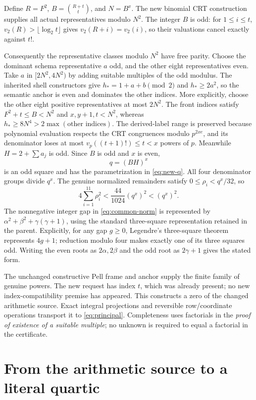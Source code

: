 \documentclass[11pt]{article}
\theoremstyle{definition}
\begin{document}
Define $R=F^2$, $B=\binom{R+t}{t}$, and $N=B^x$. The new binomial
CRT construction supplies all actual representatives modulo $N^2$.
The integer $B$ is odd: for $1\le i\le t$,
$v_2(R)>\lfloor\log_2t\rfloor$ gives $v_2(R+i)=v_2(i)$, so their
valuations cancel exactly against $t!$.

Consequently the representative classes modulo $N^2$ have free parity.
Choose the dominant schema representative $a$ odd, and the other eight
representatives even. Take $a$ in $[2N^2,4N^2)$ by adding suitable
multiples of the odd modulus. The inherited shell constructors give
$h_*=1+a+b\pmod2$ and $h_*\ge2a^2$, so the semantic anchor is even
and dominates the other indices. More explicitly, choose the other eight
positive representatives at most $2N^2$. The front indices satisfy
$F^2+t\le B<N^2$ and $x,y+1,t<N^2$, whereas
$h_*\ge8N^4>2\max(\text{other indices})$.
The derived-label range is preserved because polynomial evaluation
respects the CRT congruences modulo $p^{2xe}$, and its denominator loses
at most $v_p((t+1)!)\le t<x$ powers of $p$.
Meanwhile $H=2+\sum a_j$ is odd.
Since $B$ is odd and $x$ is even,
\[
                  q=(BH)^x
\]
is an odd square and has the parametrization in \eqref{eq:new-q}.
All four denominator groups divide $q^x$. The genuine normalized
remainders satisfy $0\le\rho_i<q^x/32$, so
\[
 4\sum_{i=1}^{11}\rho_i^2<\frac{44}{1024}(q^x)^2<(q^x)^2.
\]
The nonnegative integer gap in \eqref{eq:common-norm} is represented by
$\alpha^2+\beta^2+\gamma(\gamma+1)$, using the standard three-square
representation retained in the parent. Explicitly, for any gap $g\ge0$,
Legendre's three-square theorem represents $4g+1$; reduction modulo four
makes exactly one of its three squares odd. Writing the even roots as
$2\alpha,2\beta$ and the odd root as $2\gamma+1$ gives the stated form.

The unchanged constructive Pell frame and anchor supply the finite
family of genuine powers. The new request has index $t$, which was
already present; no new index-compatibility premise has appeared.
This constructs a zero of the changed arithmetic source. Exact integral
projections and reversible row/coordinate operations transport it to
\eqref{eq:principal}. Completeness uses factorials in the \emph{proof of
existence of a suitable multiple}; no unknown is required to equal a
factorial in the certificate.

\section{From the arithmetic source to a literal quartic}
\end{document}
